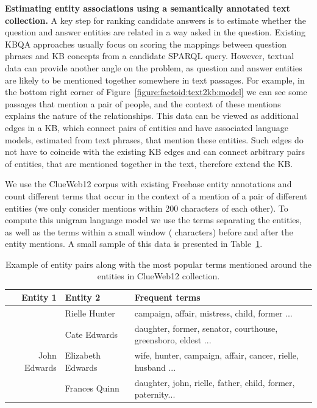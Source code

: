 \textbf{Estimating entity associations using a semantically annotated text collection.}
A key step for ranking candidate answers is to estimate whether the question and answer entities are related in a way asked in the question.
Existing KBQA approaches usually focus on scoring the mappings between question phrases and KB concepts from a candidate SPARQL query.
However, textual data can provide another angle on the problem, as question and answer entities are likely to be mentioned together somewhere in text passages.
For example, in the bottom right corner of Figure~\ref{figure:factoid:text2kb:model} we can see some passages that mention a pair of people, and the context of these mentions explains the nature of the relationships.
This data can be viewed as additional edges in a KB, which connect pairs of entities and have associated language models, estimated from text phrases, that mention these entities.
Such edges do not have to coincide with the existing KB edges and can connect arbitrary pairs of entities, that are mentioned together in the text, therefore extend the KB.

We use the ClueWeb12 corpus with existing Freebase entity annotations and count different terms that occur in the context of a mention of a pair of different entities (we only consider mentions within 200 characters of each other).
To compute this unigram language model we use the terms separating the entities, as well as the terms within a small window ( characters) before and after the entity mentions.
A small sample of this data is presented in Table~\ref{table:factoid:text2kb:clueweb_entitypairs_langmodel}.

\begin{table}
\centering
\small
\begin{tabular}{rlp{7cm}}
Entity 1 & Entity 2 & Frequent terms\\
\hline
 & Rielle Hunter & campaign, affair, mistress, child, former ...\\
 & Cate Edwards & daughter, former, senator, courthouse, greensboro, eldest ...\\
John Edwards & Elizabeth Edwards & wife, hunter, campaign, affair, cancer, rielle, husband ...\\
 & Frances Quinn & daughter, john, rielle, father, child, former, paternity...\\
 \hline
\end{tabular}
\caption{Example of entity pairs along with the most popular terms mentioned around the entities in ClueWeb12 collection.}
\label{table:factoid:text2kb:clueweb_entitypairs_langmodel}
\end{table}

